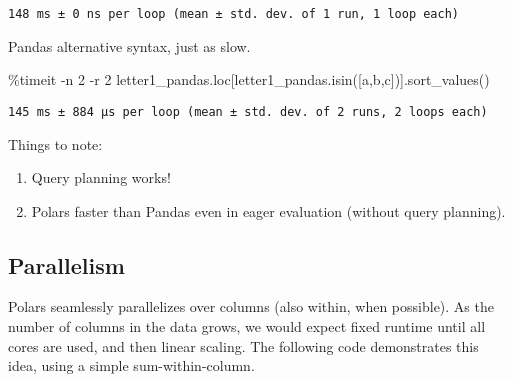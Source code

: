\documentclass[
  letterpaper,
  DIV=11,
  numbers=noendperiod]{scrartcl}
\newenvironment{Shaded}{\begin{snugshade}}{\end{snugshade}}
\newcommand{\DecValTok}[1]{\textcolor[rgb]{0.68,0.00,0.00}{#1}}
\newcommand{\NormalTok}[1]{\textcolor[rgb]{0.00,0.23,0.31}{#1}}
\newcommand{\OperatorTok}[1]{\textcolor[rgb]{0.37,0.37,0.37}{#1}}
\newcommand{\StringTok}[1]{\textcolor[rgb]{0.13,0.47,0.30}{#1}}
\providecommand{\tightlist}{%
  \setlength{\itemsep}{0pt}\setlength{\parskip}{0pt}}\usepackage{longtable,booktabs,array}
\begin{document}
\begin{verbatim}
148 ms ± 0 ns per loop (mean ± std. dev. of 1 run, 1 loop each)
\end{verbatim}

Pandas alternative syntax, just as slow.

\begin{Shaded}
\begin{Highlighting}[]
\OperatorTok{\%}\NormalTok{timeit }\OperatorTok{{-}}\NormalTok{n }\DecValTok{2} \OperatorTok{{-}}\NormalTok{r }\DecValTok{2}\NormalTok{ letter1\_pandas.loc[letter1\_pandas.isin([}\StringTok{\textquotesingle{}a\textquotesingle{}}\NormalTok{,}\StringTok{\textquotesingle{}b\textquotesingle{}}\NormalTok{,}\StringTok{\textquotesingle{}c\textquotesingle{}}\NormalTok{])].sort\_values()}
\end{Highlighting}
\end{Shaded}

\begin{verbatim}
145 ms ± 884 µs per loop (mean ± std. dev. of 2 runs, 2 loops each)
\end{verbatim}

Things to note:

\begin{enumerate}
\def\labelenumi{\arabic{enumi}.}
\tightlist
\item
  Query planning works!
\item
  Polars faster than Pandas even in eager evaluation (without query
  planning).
\end{enumerate}

\hypertarget{parallelism}{%
\subsection{Parallelism}\label{parallelism}}

Polars seamlessly parallelizes over columns (also within, when
possible). As the number of columns in the data grows, we would expect
fixed runtime until all cores are used, and then linear scaling. The
following code demonstrates this idea, using a simple sum-within-column.
\end{document}

